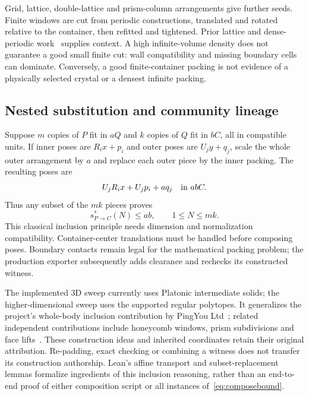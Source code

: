 \documentclass[11pt,a4paper]{article}
\begin{document}
Grid, lattice, double-lattice and prism-column arrangements give further seeds. Finite windows are cut from periodic constructions, translated and rotated relative to the container, then refitted and tightened. Prior lattice and dense-periodic work~\cite{betke2000,torquato2009,jiao2011} supplies context. A high infinite-volume density does not guarantee a good small finite cut: wall compatibility and missing boundary cells can dominate. Conversely, a good finite-container packing is not evidence of a physically selected crystal or a densest infinite packing.

\subsection{Nested substitution and community lineage}
Suppose $m$ copies of $P$ fit in $aQ$ and $k$ copies of $Q$ fit in $bC$, all in compatible units. If inner poses are $R_ix+p_i$ and outer poses are $U_jy+q_j$, scale the whole outer arrangement by $a$ and replace each outer piece by the inner packing. The resulting poses are
\begin{equation}\label{eq:compose}
U_jR_ix+U_jp_i+a q_j\quad\hbox{in }abC.
\end{equation}
Thus any subset of the $mk$ pieces proves
\begin{equation}\label{eq:composebound}
s^*_{P\to C}(N)\leq ab,\qquad 1\leq N\leq mk.
\end{equation}
This classical inclusion principle needs dimension and normalization compatibility. Container-center translations must be handled before composing poses. Boundary contacts remain legal for the mathematical packing problem; the production exporter subsequently adds clearance and rechecks its constructed witness.

The implemented 3D sweep currently uses Platonic intermediate solids; the higher-dimensional sweep uses the supported regular polytopes. It generalizes the project's whole-body inclusion contribution by PingYou Ltd~\cite{ping79}; related independent contributions include honeycomb windows, prism subdivisions and face lifts~\cite{pingConstructions}. These construction ideas and inherited coordinates retain their original attribution. Re-padding, exact checking or combining a witness does not transfer its construction authorship. Lean's affine transport and subset-replacement lemmas formalize ingredients of this inclusion reasoning, rather than an end-to-end proof of either composition script or all instances of~\eqref{eq:composebound}.
\end{document}
